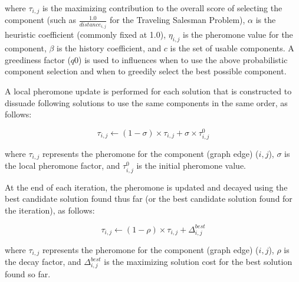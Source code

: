 where $\tau_{i,j}$ is the maximizing contribution to the overall score of selecting the component (such as $\frac{1.0}{distance_{i,j}}$ for the Traveling Salesman Problem), $\alpha$ is the heuristic coefficient (commonly fixed at 1.0), $\eta_{i,j}$ is the pheromone value for the component, $\beta$ is the history coefficient, and $c$ is the set of usable components. A greediness factor ($q0$) is used to influences when to use the above probabilistic component selection and when to greedily select the best possible component. 

A local pheromone update is performed for each solution that is constructed to dissuade following solutions to use the same components in the same order, as follows:

\begin{equation}
\tau_{i,j} \leftarrow (1-\sigma) \times \tau_{i,j} + \sigma \times \tau_{i,j}^{0}
\end{equation}

where $\tau_{i,j}$ represents the pheromone for the component (graph edge) ($i,j$), $\sigma$ is the local pheromone factor, and $\tau_{i,j}^{0}$ is the initial pheromone value.

At the end of each iteration, the pheromone is updated and decayed using the best candidate solution found thus far (or the best candidate solution found for the iteration), as follows:

\begin{equation}
\tau_{i,j} \leftarrow (1-\rho) \times \tau_{i,j} + \Delta_{i,j}^{best}
\end{equation}

where $\tau_{i,j}$ represents the pheromone for the component (graph edge) ($i,j$), $\rho$ is the decay factor, and $\Delta_{i,j}^{best} $ is the maximizing solution cost for the best solution found so far. 

